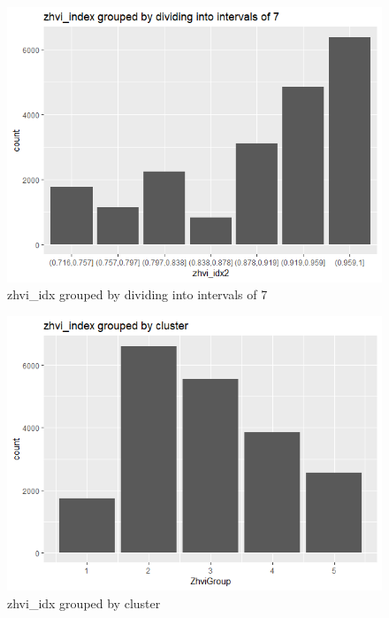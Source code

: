 \documentclass[12pt,a4paper]{article}
\begin{document}
\begin{figure}[H]
	\centering
	\caption{zhvi\_idx grouped by dividing into intervals of 7}
	\label{fig:zhviindex-grouped-by-automatic-intervals}
	\includegraphics[width=0.8\linewidth]{"zhvi_index grouped by automatic intervals"}
\end{figure}

\begin{figure}[H]
	\centering
	\caption{zhvi\_idx grouped by cluster}
	\label{fig:zhviindex-grouped-by-cluster}
	\includegraphics[width=0.8\linewidth]{"zhvi_index grouped by cluster"}
\end{figure}
\end{document}
